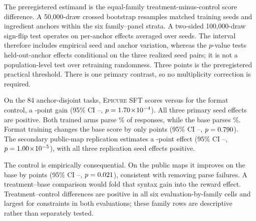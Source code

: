 \documentclass[10pt,twocolumn]{article}
\newcommand{\epicure}{\textsc{Epicure}}
\begin{document}
The preregistered estimand is the equal-family treatment-minus-control score difference. A
50,000-draw crossed bootstrap resamples matched training seeds and ingredient anchors within the
six family--panel strata. A two-sided 100,000-draw sign-flip test operates on per-anchor effects
averaged over seeds. The interval therefore includes empirical seed and anchor variation, whereas
the $p$-value tests held-out-anchor effects conditional on the three realized seed pairs; it is not
a population-level test over retraining randomness. Three points is the preregistered practical
threshold. There is one primary contrast, so no multiplicity correction is required.

\begin{table}[t]
  \centering
  \small
  \resizebox{0.88\textwidth}{!}{}
  \caption{Reward transfer. Scores average three training seeds except the unmodified base.
  $\Delta$ is Epicure SFT minus format control; the public-map row is a declared secondary
  replication opened only after the primary analysis was sealed.}
  \label{tab:transfer}
\end{table}

On the 84 anchor-disjoint tasks, \epicure{} SFT scores \FBTransferPrimaryTreatment{} versus
\FBTransferPrimaryControl{} for the format control, a \FBTransferPrimaryGain{}-point gain
(95\% CI \FBTransferPrimaryCILow{}--\FBTransferPrimaryCIHigh{},
$p=1.70\!\times\!10^{-4}{}$). All three primary seed effects are positive. Both trained arms parse
\FBTransferPrimaryControlParse{}\% of responses, while the base parses
\FBTransferPrimaryBaseParse{}\%. Format training changes the base score by only
\FBTransferPrimaryControlBaseGain{} points (95\% CI
\FBTransferPrimaryControlBaseCILow{}--\FBTransferPrimaryControlBaseCIHigh{},
$p=0.790{}$). The secondary public-map replication estimates a
\FBTransferPublicGain{}-point effect (95\% CI
\FBTransferPublicCILow{}--\FBTransferPublicCIHigh{}, $p=1.00\!\times\!10^{-5}{}$), with all three
replication seed effects positive.

The control is empirically consequential. On the public maps it improves on the base by
\FBTransferPublicControlBaseGain{} points (95\% CI
\FBTransferPublicControlBaseCILow{}--\FBTransferPublicControlBaseCIHigh{},
$p=0.021{}$), consistent with removing parse failures. A treatment--base
comparison would fold that syntax gain into the reward effect. Treatment--control differences are
positive in all six evaluation-by-family cells and largest for constraints in both evaluations;
these family rows are descriptive rather than separately tested.
\end{document}
